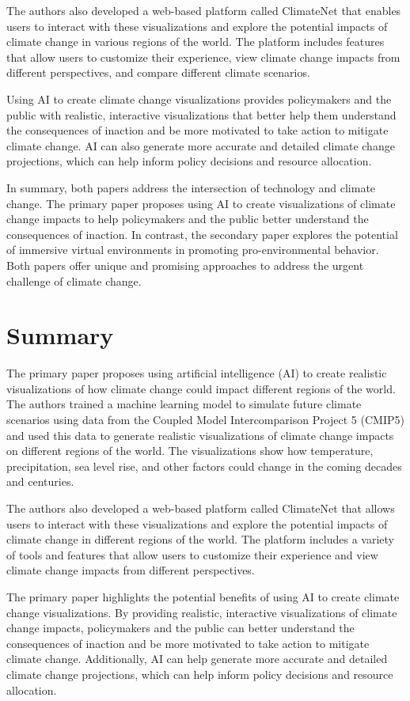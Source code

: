 \documentclass{article}
\begin{document}
The authors also developed a web-based platform called ClimateNet that enables users to interact with these visualizations and explore the potential impacts of climate change in various regions of the world. The platform includes features that allow users to customize their experience, view climate change impacts from different perspectives, and compare different climate scenarios.

Using AI to create climate change visualizations provides policymakers and the public with realistic, interactive visualizations that better help them understand the consequences of inaction and be more motivated to take action to mitigate climate change. AI can also generate more accurate and detailed climate change projections, which can help inform policy decisions and resource allocation.

In summary, both papers address the intersection of technology and climate change. The primary paper proposes using AI to create visualizations of climate change impacts to help policymakers and the public better understand the consequences of inaction. In contrast, the secondary paper explores the potential of immersive virtual environments in promoting pro-environmental behavior. Both papers offer unique and promising approaches to address the urgent challenge of climate change.

\section{Summary}

The primary paper proposes using artificial intelligence (AI) to create realistic visualizations of how climate change could impact different regions of the world. The authors trained a machine learning model to simulate future climate scenarios using data from the Coupled Model Intercomparison Project 5 (CMIP5) and used this data to generate realistic visualizations of climate change impacts on different regions of the world. The visualizations show how temperature, precipitation, sea level rise, and other factors could change in the coming decades and centuries.

The authors also developed a web-based platform called ClimateNet that allows users to interact with these visualizations and explore the potential impacts of climate change in different regions of the world. The platform includes a variety of tools and features that allow users to customize their experience and view climate change impacts from different perspectives.

The primary paper highlights the potential benefits of using AI to create climate change visualizations. By providing realistic, interactive visualizations of climate change impacts, policymakers and the public can better understand the consequences of inaction and be more motivated to take action to mitigate climate change. Additionally, AI can help generate more accurate and detailed climate change projections, which can help inform policy decisions and resource allocation.
\end{document}
